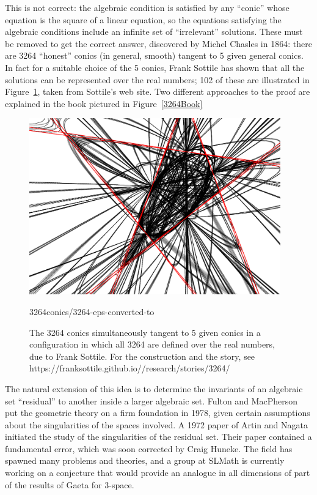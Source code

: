 \documentclass[11pt, oneside]{article}   	%
\begin{document}
This is not correct: the algebraic condition is satisfied by any ``conic''  whose equation is the square of a linear equation, so the equations satisfying the algebraic conditions include an infinite set of ``irrelevant'' solutions. These must be removed to get the correct answer, discovered by Michel Chasles in 1864: there are 3264 ``honest'' conics (in general, smooth) tangent to 5 given general conics. 
In fact for a suitable choice of the 5 conics, Frank Sottile has shown that all the solutions can be represented over the real numbers; 102 of these are illustrated in Figure~\ref{102Conics}, taken from Sottile's web site. Two different approaches to the proof are explained in the book pictured in 
Figure~\ref{3264Book}
\begin{figure}\label{102Conics}
\centerline {\includegraphics[height=3in]{3264conics/3264-eps-converted-to}}
3264conics/3264-eps-converted-to
 \caption{The 3264 conics simultaneously tangent to 5 given conics in 
 a configuration in which all 3264 are defined over the real numbers, due to 
 Frank Sottile. For the construction and the story, see 
 https://franksottile.github.io//research/stories/3264/}
\end{figure}



The natural extension of this idea is to determine the invariants of an algebraic set ``residual'' to another inside a larger algebraic set. Fulton and MacPherson put the geometric theory on a firm foundation in 1978, given certain assumptions about the singularities of the spaces involved. A 1972 paper of Artin and Nagata initiated the study of the singularities of the residual set. Their paper contained a fundamental error, which was soon corrected by Craig Huneke. The field has spawned many problems and theories, and a group at SLMath is currently working on a conjecture that would provide an analogue in all dimensions of part of the results of Gaeta for 3-space.
\end{document}
